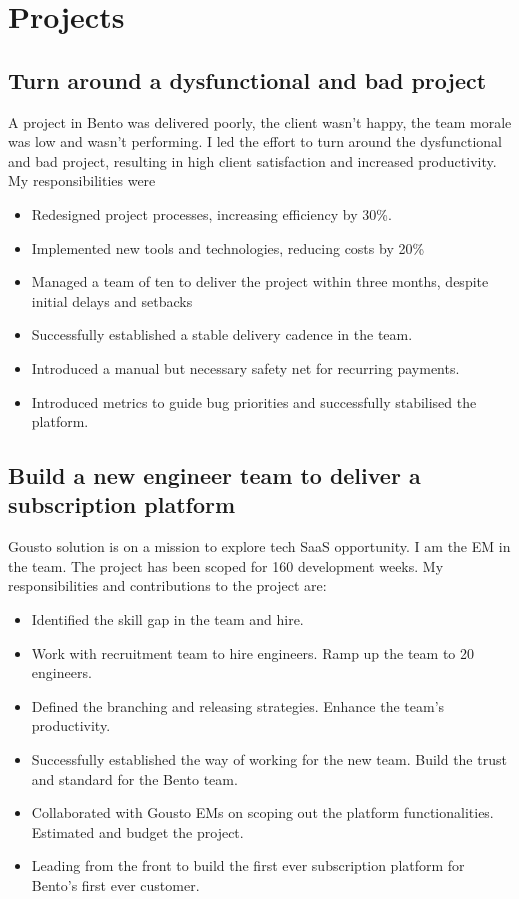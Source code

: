\documentclass[a4paper]{twentysecondcv-english} %
\begin{document}
\section{Projects}
\subsection{Turn around a dysfunctional and bad project}
A project in Bento was delivered poorly, the client wasn't happy, the team morale was low and wasn't performing. I led the effort to turn around the dysfunctional and bad project, resulting in high client satisfaction and increased productivity. My responsibilities were
\begin{itemize}
    \item Redesigned project processes, increasing efficiency by 30\%.
    \item Implemented new tools and technologies, reducing costs by 20\%
    \item Managed a team of ten to deliver the project within three months, despite initial delays and setbacks
    \item Successfully established a stable delivery cadence in the team.
    \item Introduced a manual but necessary safety net for recurring payments.
    \item Introduced metrics to guide bug priorities and successfully stabilised the platform.
\end{itemize}

\subsection{Build a new engineer team to deliver a subscription platform}

Gousto solution is on a mission to explore tech SaaS opportunity. I am the EM in the team. The project has been scoped for 160 development weeks. My responsibilities and contributions to the project are:
\begin{itemize}
    \item Identified the skill gap in the team and hire.
    \item Work with recruitment team to hire engineers. Ramp up the team to 20 engineers.
    \item Defined the branching and releasing strategies. Enhance the team's productivity.
    \item Successfully established the way of working for the new team. Build the trust and standard for the Bento team.
    \item Collaborated with Gousto EMs on scoping out the platform functionalities. Estimated and budget the project.
    \item Leading from the front to build the first ever subscription platform for Bento's first ever customer.
\end{itemize}
\end{document}
